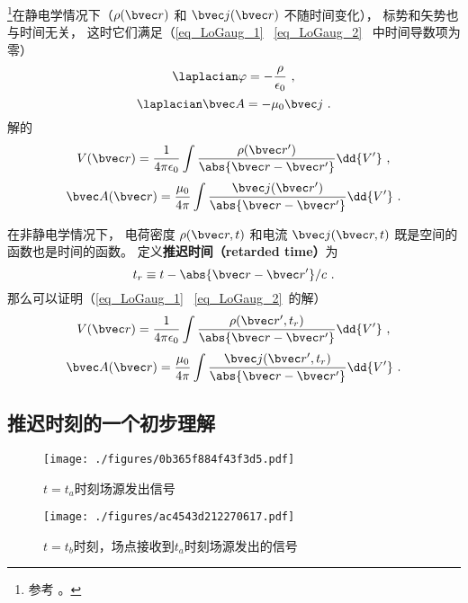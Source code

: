 

\footnote{参考 \cite{GriffE}。}在静电学情况下（$\rho(\bvec r)$ 和 $\bvec j(\bvec r)$ 不随时间变化）， 标势和矢势也与时间无关， 这时它们满足（\autoref{eq_LoGaug_1}~ \autoref{eq_LoGaug_2}~ 中时间导数项为零）
\begin{equation}
\laplacian \varphi = -\frac{\rho}{\epsilon_0}~,
\end{equation}
\begin{equation}
\laplacian \bvec A = -\mu_0 \bvec j~.
\end{equation}
解的
\begin{equation}
V(\bvec r) = \frac{1}{4\pi\epsilon_0} \int \frac{\rho(\bvec r')}{\abs{\bvec r - \bvec r'}} \dd{V'}~,
\end{equation}
\begin{equation}
\bvec A(\bvec r) = \frac{\mu_0}{4\pi} \int \frac{\bvec j(\bvec r')}{\abs{\bvec r - \bvec r'}} \dd{V'}~.
\end{equation}

在非静电学情况下， 电荷密度 $\rho(\bvec r, t)$ 和电流 $\bvec j(\bvec r, t)$ 既是空间的函数也是时间的函数。 定义\textbf{推迟时间（retarded time）}为
\begin{equation}
t_r \equiv t - \abs{\bvec r - \bvec r'}/c~.
\end{equation}
那么可以证明（\autoref{eq_LoGaug_1}~ \autoref{eq_LoGaug_2}~的解）
\begin{equation}
V(\bvec r) = \frac{1}{4\pi\epsilon_0} \int \frac{\rho(\bvec r', t_r)}{\abs{\bvec r - \bvec r'}} \dd{V'}~,
\end{equation}
\begin{equation}
\bvec A(\bvec r) = \frac{\mu_0}{4\pi} \int \frac{\bvec j(\bvec r', t_r)}{\abs{\bvec r - \bvec r'}} \dd{V'}~.
\end{equation}

\subsection{推迟时刻的一个初步理解}
\begin{figure}[ht]
\centering
\texttt{[image: ./figures/0b365f884f43f3d5.pdf]}
\caption{$t=t_a$时刻场源发出信号} \label{fig_RetPt0_1}
\end{figure}
\begin{figure}[ht]
\centering
\texttt{[image: ./figures/ac4543d212270617.pdf]}
\caption{$t=t_b$时刻，场点接收到$t_a$时刻场源发出的信号} \label{fig_RetPt0_2}
\end{figure}

